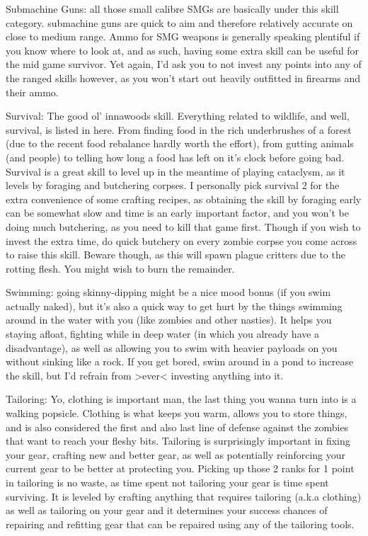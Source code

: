 \documentclass[11pt]{report}
\begin{document}
Submachine Guns: all those small calibre SMGs are basically under this skill category. submachine guns are quick to aim and therefore relatively accurate on close to medium range. Ammo for SMG weapons is generally speaking plentiful if you know where to look at, and as such, having some extra skill can be useful for the mid game survivor. Yet again, I'd ask you to not invest any points into any of the ranged skills however, as you won't start out heavily outfitted in firearms and their ammo.

Survival: The good ol' innawoods skill. Everything related to wildlife, and well, survival, is listed in here. From finding food in the rich underbrushes of a forest (due to the recent food rebalance hardly worth the effort), from gutting animals (and people) to telling how long a food has left on it's clock before going bad. Survival is a great skill to level up in the meantime of playing cataclysm, as it levels by foraging and butchering corpses. I personally pick survival 2 for the extra convenience of some crafting recipes, as obtaining the skill by foraging early can be somewhat slow and time is an early important factor, and you won't be doing much butchering, as you need to kill that game first. Though if you wish to invest the extra time, do quick butchery on every zombie corpse you come across to raise this skill. Beware though, as this will spawn plague critters due to the rotting flesh. You might wish to burn the remainder.

Swimming: going skinny-dipping might be a nice mood bonus (if you swim actually naked), but it's also a quick way to get hurt by the things swimming around in the water with you (like zombies and other nasties). It helps you staying afloat, fighting while in deep water (in which you already have a disadvantage), as well as allowing you to swim with heavier payloads on you without sinking like a rock. If you get bored, swim around in a pond to increase the skill, but I'd refrain from >ever< investing anything into it.

Tailoring: Yo, clothing is important man, the last thing you wanna turn into is a walking popsicle. Clothing is what keeps you warm, allows you to store things, and is also considered the first and also last line of defense against the zombies that want to reach your fleshy bits. Tailoring is surprisingly important in fixing your gear, crafting new and better gear, as well as potentially reinforcing your current gear to be better at protecting you. Picking up those 2 ranks for 1 point in tailoring is no waste, as time spent not tailoring your gear is time spent surviving. It is leveled by crafting anything that requires tailoring (a.k.a clothing) as well as tailoring on your gear and it determines your success chances of repairing and refitting gear that can be repaired using any of the tailoring tools.
\end{document}
